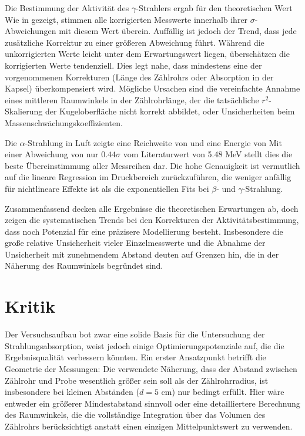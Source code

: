 Die Bestimmung der Aktivität des $\gamma$-Strahlers ergab für den theoretischen Wert 
Wie in  gezeigt, stimmen alle korrigierten Messwerte innerhalb ihrer $\sigma$-Abweichungen mit diesem Wert überein. Auffällig ist jedoch der Trend, dass jede zusätzliche Korrektur zu einer größeren Abweichung führt. Während die unkorrigierten Werte leicht unter dem Erwartungswert liegen, überschätzen die korrigierten Werte tendenziell. Dies legt nahe, dass mindestens eine der vorgenommenen Korrekturen (Länge des Zählrohrs oder Absorption in der Kapsel) überkompensiert wird. Mögliche Ursachen sind die vereinfachte Annahme eines mittleren Raumwinkels in der Zählrohrlänge, der die tatsächliche $r^2$-Skalierung der Kugeloberfläche nicht korrekt abbildet, oder Unsicherheiten beim Massenschwächungskoeffizienten.

Die $\alpha$-Strahlung in Luft zeigte eine Reichweite von 
und eine Energie von 
Mit einer Abweichung von nur $0.44\sigma$ vom Literaturwert von 5.48 MeV stellt dies die beste Übereinstimmung aller Messreihen dar. Die hohe Genauigkeit ist vermutlich auf die lineare Regression im Druckbereich zurückzuführen, die weniger anfällig für nichtlineare Effekte ist als die exponentiellen Fits bei $\beta$- und $\gamma$-Strahlung.

Zusammenfassend decken alle Ergebnisse die theoretischen Erwartungen ab, doch zeigen die systematischen Trends bei den Korrekturen der Aktivitätsbestimmung, dass noch Potenzial für eine präzisere Modellierung besteht. Insbesondere die große relative Unsicherheit vieler Einzelmesswerte und die Abnahme der Unsicherheit mit zunehmendem Abstand deuten auf Grenzen hin, die in der Näherung des Raumwinkels begründet sind.

\section{Kritik}
\label{sec:Kritik}
Der Versuchsaufbau bot zwar eine solide Basis für die Untersuchung der Strahlungsabsorption, weist jedoch einige Optimierungspotenziale auf, die die Ergebnisqualität verbessern könnten. Ein erster Ansatzpunkt betrifft die Geometrie der Messungen: Die verwendete Näherung, dass der Abstand zwischen Zählrohr und Probe wesentlich größer sein soll als der Zählrohrradius, ist insbesondere bei kleinen Abständen ($d = 5$ cm) nur bedingt erfüllt. Hier wäre entweder ein größerer Mindestabstand sinnvoll oder eine detailliertere Berechnung des Raumwinkels, die die vollständige Integration über das Volumen des Zählrohrs berücksichtigt anstatt einen einzigen Mittelpunktswert zu verwenden.

